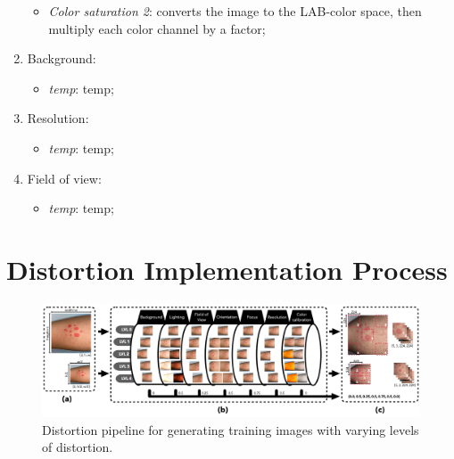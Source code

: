 \begin{enumerate}
\begin{itemize}
            \item \textit{Color saturation 2}: converts the image to the LAB-color space, then multiply each color channel by a factor;
        \end{itemize}
    \item Background:
        \begin{itemize}
            \item \textit{temp}: temp;
        \end{itemize}
    \item Resolution:
        \begin{itemize}
            \item \textit{temp}: temp;
        \end{itemize}
    \item Field of view:
        \begin{itemize}
            \item \textit{temp}: temp;
        \end{itemize}
\end{enumerate}

\section{Distortion Implementation Process}
\label{sec:DistProcess}

\begin{figure}[ht]
    \centering
    \includegraphics[keepaspectratio,width=15cm]{img/Distortion_pipeline.jpg}
    \caption{Distortion pipeline for generating training images with varying levels of distortion.}
    \label{fig:DistPipeline}
\end{figure}

